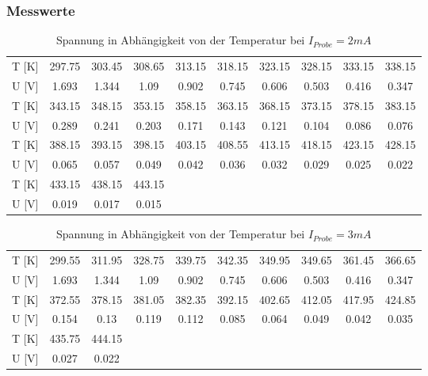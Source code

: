 \subsubsection{Messwerte}
\begin{table}[H]
\centering
\begin{tabular}{|c||c|c|c|c|c|c|c|c|c|}
\hline
T [K] & 297.75 & 303.45 & 308.65 & 313.15 & 318.15 & 323.15 & 328.15 & 333.15 & 338.15 \\
U [V] & 1.693 & 1.344 & 1.09 & 0.902 & 0.745 & 0.606 & 0.503 & 0.416 & 0.347\\
\hline
 T [K] & 343.15 & 348.15 & 353.15 & 358.15 & 363.15 & 368.15 & 373.15 & 378.15 & 383.15\\ 
U [V] & 0.289 & 0.241 &
   0.203 & 0.171 & 0.143 & 0.121 & 0.104 & 0.086 & 0.076\\ 
   \hline
 T [K] & 388.15 &
   393.15 & 398.15 & 403.15 & 408.55 & 413.15 & 418.15 & 423.15 & 428.15\\ 
   U [V] & 0.065 & 0.057 & 0.049 & 0.042
   & 0.036 & 0.032 & 0.029 & 0.025 & 0.022\\ 
   \hline
T [K]& 433.15 & 438.15 & 443.15 & & & & & & \\
U [V] & 0.019 & 0.017 & 0.015 & & & & & & \\
 \hline
\end{tabular}
\caption{Spannung in Abhängigkeit von der Temperatur bei $I_{Probe}=2mA$}
\end{table}  

\begin{table}[H]
\centering
\begin{tabular}{|c||c|c|c|c|c|c|c|c|c|}
\hline
T [K] & 299.55 & 311.95 & 328.75 & 339.75 & 342.35 & 349.95 & 349.65 & 361.45 & 366.65 \\
U [V] & 1.693 & 1.344 & 1.09 & 0.902 & 0.745 & 0.606 & 0.503 & 0.416 & 0.347\\
\hline
 T [K] & 372.55
   & 378.15 & 381.05 & 382.35 & 392.15 & 402.65 & 412.05 & 417.95 & 424.85\\ 
U [V] & 0.154 & 0.13 &
   0.119 & 0.112 & 0.085 & 0.064 & 0.049 & 0.042 & 0.035\\ 
   \hline
T [K]& 435.75 &
   444.15 & & & & & & & \\
U [V]  & 0.027 & 0.022 &  & & & & & & \\
 \hline
\end{tabular}
\caption{Spannung in Abhängigkeit von der Temperatur bei $I_{Probe}=3mA$}
\end{table} 

